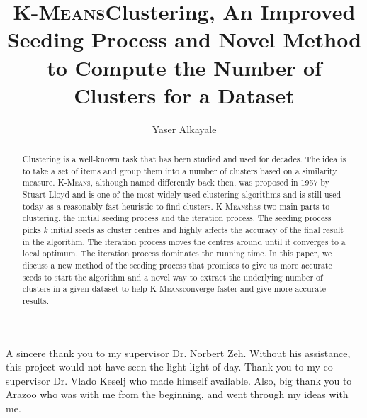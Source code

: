 \documentclass[12pt]{dalthesis}
\newcommand*{\kmeansn}{\textsc{K-Means}} %
\newcommand*{\kmeans}{\kmeansn } %
\DeclarePairedDelimiter\abs{\lvert}{\rvert}
\DeclarePairedDelimiter\norm{\lVert}{\rVert}
\begin{document}
\makeatletter
\let\oldabs\abs
\def\abs{\@ifstar{\oldabs}{\oldabs*}}
\let\oldnorm\norm
\def\norm{\@ifstar{\oldnorm}{\oldnorm*}}
\def\BState{\State\hskip-\ALG@thistlm}
\makeatother

\title{\kmeans Clustering, An Improved Seeding Process and Novel Method to Compute the Number of Clusters for a Dataset} %
\author{Yaser Alkayale}
\bcshon  %

\nolistoftables
\nolistoffigures

\frontmatter

\begin{abstract}
  Clustering is a well-known task that has been studied and used for decades. The idea is to take a set of items and group them into a number of clusters based on a similarity measure. \kmeansn, although named differently back then, was proposed in 1957 by Stuart Lloyd and is one of the most widely used clustering algorithms and is still used today as a reasonably fast heuristic to find clusters. \kmeans has two main parts to clustering, the initial seeding process and the iteration process. The seeding process picks $k$ initial seeds as cluster centres and highly affects the accuracy of the final result in the algorithm. The iteration process moves the centres around until it converges to a local optimum. The iteration process dominates the running time. In this paper, we discuss a new method of the seeding process that promises to give us more accurate seeds to start the algorithm and a novel way to extract the underlying number of clusters in a given dataset to help \kmeans converge faster and give more accurate results.
\end{abstract}


\begin{acknowledgements}
  A sincere thank you to my supervisor Dr. Norbert Zeh. Without his assistance, this project would not have seen the light light of day. Thank you to my co-supervisor Dr. Vlado Keselj who made himself available. Also, big thank you to Arazoo who was with me from the beginning, and went through my ideas with me.
\end{acknowledgements}
\end{document}
